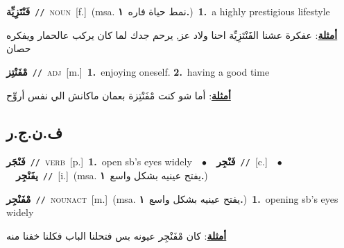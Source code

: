 \documentclass[10pt,a4paper,twoside]{article} %
\begin{document}
\begin{multicols}{2}
{\setlength\topsep{0pt}\textbf{\foreignlanguage{arabic}{فَنْتَزِيِّة}}\ {\color{gray}\texttt{//}\color{black}}\ \textsc{noun}\ [f.]\ \color{gray}(msa. \foreignlanguage{arabic}{نمط حياة فاره}~\foreignlanguage{arabic}{\textbf{١.}})\color{black}\ \textbf{1.}~a highly prestigious lifestyle\  \begin{flushright}\color{gray}\foreignlanguage{arabic}{\textbf{\underline{\foreignlanguage{arabic}{أمثلة}}}: عفكرة عشنا الفََنْتَزِيِّة احنا ولاد عز, يرحم جدك لما كان يركب عالحمار ويفكره حصان}\end{flushright}\color{black}} \vspace{2mm}

{\setlength\topsep{0pt}\textbf{\foreignlanguage{arabic}{مْفَنْتِز}}\ {\color{gray}\texttt{//}\color{black}}\ \textsc{adj}\ [m.]\ \textbf{1.}~enjoying oneself.  \textbf{2.}~having a good time\  \begin{flushright}\color{gray}\foreignlanguage{arabic}{\textbf{\underline{\foreignlanguage{arabic}{أمثلة}}}: أما شو كنت مْفَنْتِزة بعمان ماكانش الي نفس أروِّح}\end{flushright}\color{black}} \vspace{2mm}

\vspace{-3mm}
\subsection*{\color{blue}\foreignlanguage{arabic}{ف.ن.ج.ر}\color{blue}{}} 

{\setlength\topsep{0pt}\textbf{\foreignlanguage{arabic}{فَنْجَر}}\ {\color{gray}\texttt{//}\color{black}}\ \textsc{verb}\ [p.]\ \textbf{1.}~open sb's eyes widely\ \ $\bullet$\ \ \setlength\topsep{0pt}\textbf{\foreignlanguage{arabic}{فَنْجِر}}\ {\color{gray}\texttt{//}\color{black}}\ [c.]\ \ $\bullet$\ \ \setlength\topsep{0pt}\textbf{\foreignlanguage{arabic}{يفَنْجِر}}\ {\color{gray}\texttt{//}\color{black}}\ [i.]\ \color{gray}(msa. \foreignlanguage{arabic}{يفتح عينيه بشكل واسع}~\foreignlanguage{arabic}{\textbf{١.}})\color{black}\ } \vspace{2mm}

{\setlength\topsep{0pt}\textbf{\foreignlanguage{arabic}{مْفَنْجِر}}\ {\color{gray}\texttt{//}\color{black}}\ \textsc{noun\textunderscore act}\ [m.]\ \color{gray}(msa. \foreignlanguage{arabic}{يفتح عينيه بشكل واسع}~\foreignlanguage{arabic}{\textbf{١.}})\color{black}\ \textbf{1.}~opening sb's eyes widely\  \begin{flushright}\color{gray}\foreignlanguage{arabic}{\textbf{\underline{\foreignlanguage{arabic}{أمثلة}}}: كان مْفَنْجِر عيونه بس فتحلنا الباب فكلنا خفنا منه}\end{flushright}\color{black}} \vspace{2mm}


\end{multicols}
\end{document}
